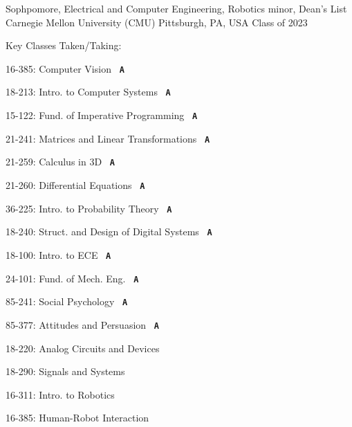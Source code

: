 
\newcommand{\grade}[1]{\ \textcolor{awesome-orange}{\textbf{\texttt{{#1}}}}}



\begin{cventries}


\cventry
{Sophpomore, Electrical and Computer Engineering, Robotics minor, Dean's List} %
{Carnegie Mellon University (CMU)} %
{Pittsburgh, PA, USA} %
{Class of 2023} %
{ %
	Key Classes Taken/Taking:\smallskip
	\begin{cvitems}
	\begin{multicols}{2}[]
        \item 16-385: Computer Vision \grade{A}
		\item 18-213: Intro. to Computer Systems \grade{A}
		\item 15-122: Fund. of Imperative Programming \grade{A}
		\item 21-241: Matrices and Linear Transformations \grade{A}
		\item 21-259: Calculus in 3D \grade{A}
        \item 21-260: Differential Equations \grade{A}
        \item 36-225: Intro. to Probability Theory \grade{A}
        \item 18-240: Struct. and Design of Digital Systems \grade{A}
        \item 18-100: Intro. to ECE \grade{A}
        \item 24-101: Fund. of Mech. Eng. \grade{A}
		\item 85-241: Social Psychology \grade{A}
        \item 85-377: Attitudes and Persuasion \grade{A} 
        \item 18-220: Analog Circuits and Devices \grade{}
        \item 18-290: Signals and Systems \grade{}
        \item 16-311: Intro. to Robotics \grade{}
        \item 16-385: Human-Robot Interaction \grade{}
	\end{multicols}
	\end{cvitems}
}


\end{cventries}